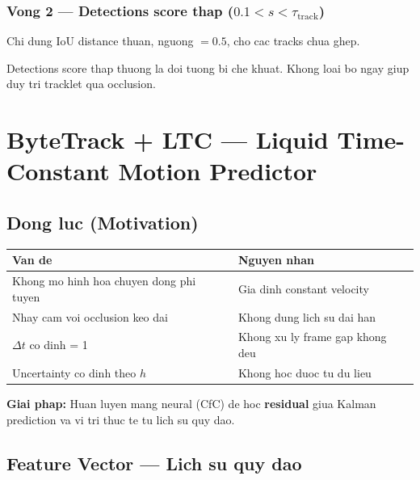 \documentclass[12pt, a4paper]{article}
\begin{document}
\subsubsection{Vong 2 --- Detections score thap ($0.1 < s < \tau_{\text{track}}$)}
Chi dung IoU distance thuan, nguong $= 0.5$, cho cac tracks chua ghep.

\begin{notebox}
Detections score thap thuong la doi tuong bi che khuat. Khong loai bo ngay
giup duy tri tracklet qua occlusion.
\end{notebox}

\newpage
\section{ByteTrack + LTC --- Liquid Time-Constant Motion Predictor}

\subsection{Dong luc (Motivation)}

\begin{definitionbox}
\begin{tabular}{@{}ll@{}}
  \textbf{Van de} & \textbf{Nguyen nhan} \\
  \midrule
  Khong mo hinh hoa chuyen dong phi tuyen & Gia dinh constant velocity \\[2pt]
  Nhay cam voi occlusion keo dai          & Khong dung lich su dai han \\[2pt]
  $\Delta t$ co dinh = 1                   & Khong xu ly frame gap khong deu \\[2pt]
  Uncertainty co dinh theo $h$             & Khong hoc duoc tu du lieu \\
\end{tabular}
\end{definitionbox}

\medskip
\textbf{Giai phap:} Huan luyen mang neural (CfC) de hoc \textbf{residual}
giua Kalman prediction va vi tri thuc te tu lich su quy dao.

\subsection{Feature Vector --- Lich su quy dao}
\end{document}
